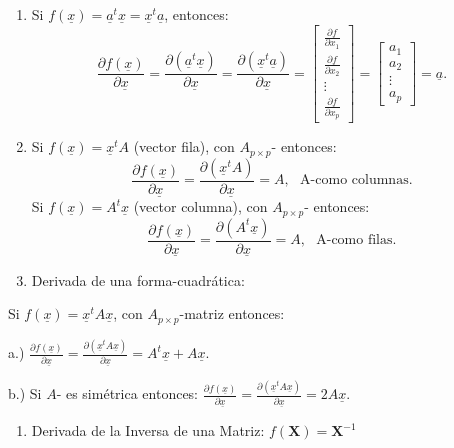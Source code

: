 \documentclass[
]{book}
\providecommand{\tightlist}{%
  \setlength{\itemsep}{0pt}\setlength{\parskip}{0pt}}
\theoremstyle{definition}
\theoremstyle{definition}
\theoremstyle{definition}
\theoremstyle{definition}
\theoremstyle{remark}
\begin{document}
\begin{enumerate}
\def\labelenumi{\arabic{enumi}.}
\item
  Si \(f(\underline{x})=\underline{a}^t\underline{x}=\underline{x}^t\underline{a}\), entonces:
  \[
  \frac{\partial f(\underline{x})}{\partial \underline{x}}=\frac{\partial (\underline{a}^t\underline{x})}{\partial \underline{x}}=\frac{\partial (\underline{x}^t\underline{a})}{\partial \underline{x}}= \begin{bmatrix}
  \frac{\partial f}{\partial x_1} \\\frac{\partial f}{\partial x_2} \\ \vdots \\ \frac{\partial f}{\partial x_p}
  \end{bmatrix}   =  \begin{bmatrix}
  a_1 \\ a_2\\ \vdots \\ a_p
  \end{bmatrix} =\underline{a}.
  \]
\item
  Si \(f(\underline{x})=\underline{x}^t A\) (vector fila), con \(A_{p\times p}\)- entonces:
  \[
  \frac{\partial f(\underline{x})}{\partial \underline{x}}=\frac{\partial (\underline{x}^t A)}{\partial \underline{x}}= A, \ \ \ \text{A-como columnas}.
  \]
  Si \(f(\underline{x})=A^t\underline{x}\) (vector columna), con \(A_{p\times p}\)- entonces:
  \[
  \frac{\partial f(\underline{x})}{\partial \underline{x}}=\frac{\partial (A^t\underline{x})}{\partial \underline{x}}= A, \ \ \ \text{A-como filas}.
  \]
\item
  Derivada de una forma-cuadrática:
\end{enumerate}

Si \(f(\underline{x})=\underline{x}^t A \underline{x}\), con \(A_{p\times p}\)-matriz entonces:

a.) \(\frac{\partial f(\underline{x})}{\partial \underline{x}}=\frac{\partial (\underline{x}^t A \underline{x})}{\partial \underline{x}}=A^t\underline{x}+A\underline{x}\).

b.) Si \(A\)- es simétrica entonces: \(\frac{\partial f(\underline{x})}{\partial \underline{x}}=\frac{\partial (\underline{x}^t A \underline{x})}{\partial \underline{x}}=2A\underline{x}\).

\begin{enumerate}
\def\labelenumi{\arabic{enumi}.}
\setcounter{enumi}{3}
\tightlist
\item
  Derivada de la Inversa de una Matriz: \(f(\mathbf{X})=\mathbf{X}^{-1}\)
\end{enumerate}
\end{document}
